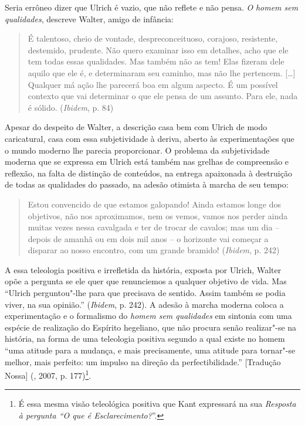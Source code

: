 Seria errôneo dizer que Ulrich é vazio, que não reflete e não pensa.
\emph{O} \emph{homem sem qualidades}, descreve Walter, amigo de
infância:

\begin{quote}
É talentoso, cheio de vontade, despreconceituoso, corajoso, resistente,
destemido, prudente. Não quero examinar isso em detalhes, acho que ele
tem todas essas qualidades. Mas também não as tem! Elas fizeram dele
aquilo que ele é, e determinaram seu caminho, mas não lhe pertencem.
[\ldots{}] Qualquer má ação lhe parecerá boa em algum aspecto. É um
possível contexto que vai determinar o que ele pensa de um assunto. Para
ele, nada é sólido. (\emph{Ibidem}, p. 84)
\end{quote}

Apesar do despeito de Walter, a descrição casa bem com Ulrich de modo
caricatural, casa com essa subjetividade à deriva, aberto às
experimentações que o mundo moderno lhe parecia proporcionar. O problema
da subjetividade moderna que se expressa em Ulrich está também nas
grelhas de compreensão e reflexão, na falta de distinção de conteúdos,
na entrega apaixonada à destruição de todas as qualidades do passado, na
adesão otimista à marcha de seu tempo:

\begin{quote}
Estou convencido de que estamos galopando! Ainda estamos longe dos
objetivos, não nos aproximamos, nem os vemos, vamos nos perder ainda
muitas vezes nessa cavalgada e ter de trocar de cavalos; mas um dia --
depois de amanhã ou em dois mil anos -- o horizonte vai começar a
disparar ao nosso encontro, com um grande bramido! (\emph{Ibidem}, p.
242)
\end{quote}

A essa teleologia positiva e irrefletida da história, exposta por
Ulrich, Walter opõe a pergunta se ele quer que renunciemos a qualquer
objetivo de vida. Mas ``Ulrich perguntou"-lhe para que precisava de
sentido. Assim também se podia viver, na sua opinião.'' (\emph{Ibidem},
p. 242). A adesão à marcha moderna coloca a experimentação e o
formalismo do \emph{homem sem qualidades} em sintonia com uma espécie de
realização do Espírito hegeliano, que não procura senão realizar"-se na
história, na forma de uma teleologia positiva segundo a qual existe no
homem ``uma atitude para a mudança, e mais precisamente, uma atitude
para tornar"-se melhor, mais perfeito: um impulso na direção da
perfectibilidade.'' [Tradução Nossa] (, 2007, p. 177)\footnote{É
  essa mesma visão teleológica positiva que Kant expressará na sua
  \emph{Resposta à pergunta ``O que é Esclarecimento?}''.}.

